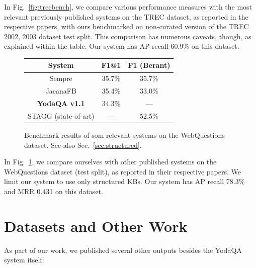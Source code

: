 In Fig.~\ref{fig:trecbench}, we compare various performance measures
with the most relevant previously published systems
on the TREC dataset, as reported in the respective papers,
with ours benchmarked on non-curated version of the TREC 2002, 2003 dataset test split.
This comparison has numerous caveats, though, as explained within the table.
Our system has AP recall 60.9\% on this dataset.

\begin{figure}[ht]
\centering
\begin{tabular}{|c|cc|}
\hline
System & F1@1 & F1 (Berant) \\ \hline
Sempre & 35.7\% & 35.7\% \\
JacanaFB & 35.4\% & 33.0\% \\
\textbf{YodaQA v1.1} & 34.3\% & --- \\
\hline
STAGG (state-of-art) & --- & 52.5\% \\
\hline
\end{tabular}
\vspace*{-0.2cm}
\caption{Benchmark results of som relevant systems on the WebQuestions dataset. See also Sec.~\ref{sec:structured}.}
\label{fig:wqbench}
\end{figure}

In Fig.~\ref{fig:wqbench}, we compare ourselves with other published systems
on the WebQuestions dataset (test split), as reported in their respective papers.
We limit our system to use only structured KBs.
Our system has AP recall 78.3\% and MRR 0.431 on this dataset.




\section{Datasets and Other Work}

As part of our work, we published several other outputs besides the YodaQA system itself:

